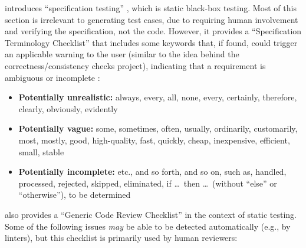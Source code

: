     \citeauthor{Patton2006} introduces ``specification testing''
    \citeyearpar[pp.~56-62]{Patton2006}, which is static black-box testing.
    Most of this section is irrelevant to generating test cases, due to
    requiring human involvement and verifying the specification, not the code.
    However, it provides a ``Specification Terminology Checklist''
    \citep[p.~61]{Patton2006} that includes some keywords that, if found, could
    trigger an applicable warning to the user (similar to the idea behind the
    correctness/consistency checks project), indicating that a requirement is
    ambiguous or incomplete \citep[see][p.~1-8]{SWEBOK2024}:

    \begin{itemize}
        \item \textbf{Potentially unrealistic:} always, every, all, none, every,
              certainly, therefore, clearly, obviously, evidently
        \item \textbf{Potentially vague:} some, sometimes, often, usually,
              ordinarily, customarily, most, mostly, good, high-quality, fast,
              quickly, cheap, inexpensive, efficient, small, stable
        \item \textbf{Potentially incomplete:} etc., and so forth, and so on,
              such as, handled, processed, rejected, skipped, eliminated,
              if \dots\ then \dots\ (without ``else'' or ``otherwise''),
              to be determined \citep[p.~408]{vanVliet2000}
    \end{itemize}

    \citeauthor{Patton2006} also provides a ``Generic Code Review Checklist''
    \citeyearpar[pp.~99-103]{Patton2006} in the context of static testing.
    Some of the following issues \emph{may} be able to be detected
    automatically (e.g., by linters), but this checklist is primarily used
    by human reviewers:

